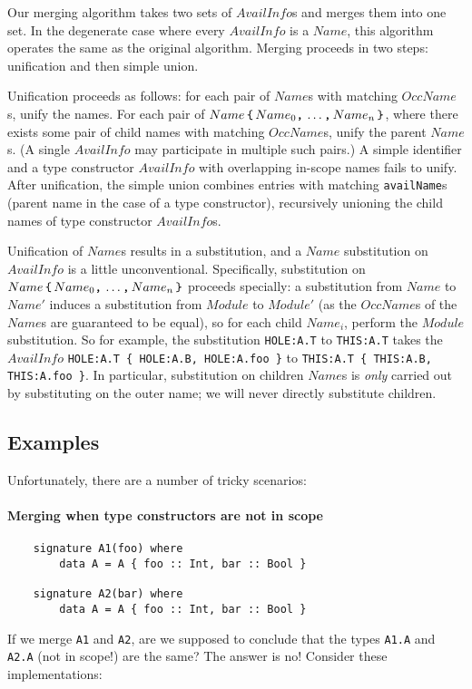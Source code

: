 \documentclass{article}
\begin{document}
Our merging algorithm takes two sets of $AvailInfo$s and merges them
into one set.  In the degenerate case where every $AvailInfo$ is a
$Name$, this algorithm operates the same as the original algorithm.
Merging proceeds in two steps: unification and then simple union.

Unification proceeds as follows: for each pair of $Name$s with
matching $OccName$s, unify the names.  For each pair of $Name\, \verb|{|\,
Name_0\verb|,|\, \ldots\verb|,|\, Name_n\, \verb|}|$, where there
exists some pair of child names with matching $OccName$s, unify the
parent $Name$s.  (A single $AvailInfo$ may participate in multiple such
pairs.)  A simple identifier and a type constructor $AvailInfo$ with
overlapping in-scope names fails to unify.  After unification,
the simple union combines entries with matching \verb|availName|s (parent
name in the case of a type constructor), recursively unioning the child
names of type constructor $AvailInfo$s.

Unification of $Name$s results in a substitution, and a $Name$ substitution
on $AvailInfo$ is a little unconventional.  Specifically, substitution on $Name\, \verb|{|\,
Name_0\verb|,|\, \ldots\verb|,|\, Name_n\, \verb|}|$ proceeds specially:
a substitution from $Name$ to $Name'$ induces a substitution from
$Module$ to $Module'$ (as the $OccName$s of the $Name$s are guaranteed
to be equal), so for each child $Name_i$, perform the $Module$
substitution.  So for example, the substitution \verb|HOLE:A.T| to \verb|THIS:A.T|
takes the $AvailInfo$ \verb|HOLE:A.T { HOLE:A.B, HOLE:A.foo }| to
\verb|THIS:A.T { THIS:A.B, THIS:A.foo }|.  In particular, substitution
on children $Name$s is \emph{only} carried out by substituting on the outer name;
we will never directly substitute children.

\subsection{Examples}

Unfortunately, there are a number of tricky scenarios:

\paragraph{Merging when type constructors are not in scope}

\begin{verbatim}
    signature A1(foo) where
        data A = A { foo :: Int, bar :: Bool }

    signature A2(bar) where
        data A = A { foo :: Int, bar :: Bool }
\end{verbatim}
%
If we merge \verb|A1| and \verb|A2|, are we supposed to conclude that
the types \verb|A1.A| and \verb|A2.A| (not in scope!) are the same?
The answer is no!  Consider these implementations:
\end{document}
